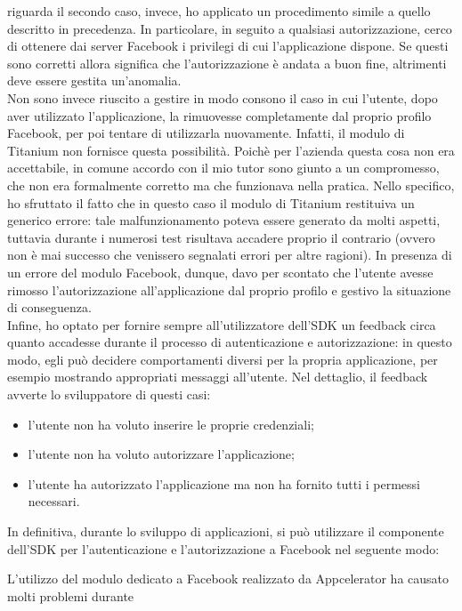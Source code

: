 				riguarda il secondo caso, invece, ho applicato un procedimento simile a quello descritto in precedenza. In
				particolare, in seguito a qualsiasi autorizzazione, cerco di ottenere dai server Facebook i privilegi di cui
				l'applicazione dispone. Se questi sono corretti allora significa che l'autorizzazione è andata a buon fine,
				altrimenti deve essere gestita un'anomalia.\\
				Non sono invece riuscito a gestire in modo consono il caso in cui l'utente, dopo aver utilizzato l'applicazione, la
				rimuovesse completamente dal proprio profilo Facebook, per poi tentare di utilizzarla nuovamente. Infatti, il modulo
				di Titanium non fornisce questa possibilità. Poichè per l'azienda questa cosa non era accettabile, in comune accordo
				con il mio tutor sono giunto a un compromesso, che non era formalmente corretto ma che funzionava nella pratica. Nello
				specifico, ho sfruttato il fatto che in questo caso il modulo di Titanium restituiva un generico errore: tale
				malfunzionamento poteva essere generato da molti aspetti, tuttavia durante i numerosi test risultava accadere proprio
				il contrario (ovvero non è mai successo che venissero segnalati errori per altre ragioni). In presenza di un errore
				del modulo Facebook, dunque, davo per scontato che l'utente avesse rimosso l'autorizzazione all'applicazione dal
				proprio profilo e gestivo la situazione di conseguenza.\\
				Infine, ho optato per fornire sempre all'utilizzatore dell'SDK un feedback circa quanto accadesse durante il
				processo di autenticazione e autorizzazione: in questo modo, egli può decidere comportamenti diversi per la propria
				applicazione, per esempio mostrando appropriati messaggi all'utente. Nel dettaglio, il feedback avverte lo
				sviluppatore di questi casi:
				\begin{itemize}
					\item l'utente non ha voluto inserire le proprie credenziali;
					\item l'utente non ha voluto autorizzare l'applicazione;
					\item l'utente ha autorizzato l'applicazione ma non ha fornito tutti i permessi necessari.
				\end{itemize}
				In definitiva, durante lo sviluppo di applicazioni, si può utilizzare il componente dell'SDK per l'autenticazione e
				l'autorizzazione a Facebook nel seguente modo:
				
				L'utilizzo del modulo dedicato a Facebook realizzato da Appcelerator ha causato molti problemi durante
